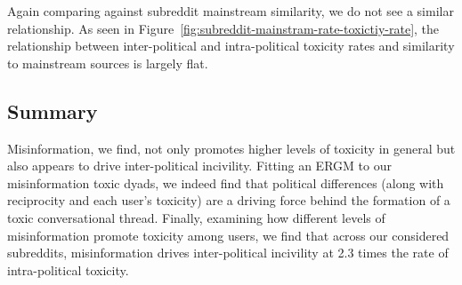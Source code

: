 Again comparing against subreddit mainstream similarity, we do not see a similar relationship. As seen in Figure~\ref{fig:subreddit-mainstram-rate-toxictiy-rate}, the relationship between inter-political and intra-political toxicity rates and similarity to mainstream sources is largely flat. 


\subsection{Summary} Misinformation, we find, not only promotes higher levels of toxicity in general but also appears to drive inter-political incivility. Fitting an ERGM to our misinformation toxic dyads, we indeed find that political differences (along with reciprocity and each user's toxicity) are a driving force behind the formation of a toxic conversational thread. Finally, examining how different levels of misinformation promote toxicity among users, we find that across our considered subreddits, misinformation drives inter-political incivility at 2.3 times the rate of intra-political toxicity. 





















 








    






























